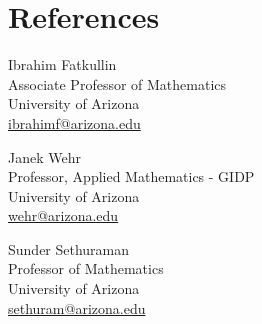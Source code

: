 \documentclass[11pt,letterpaper]{article}
\begin{document}
\section{References}
\begin{minipage}[t]{0.48\textwidth}
  Ibrahim Fatkullin\\
  Associate Professor of Mathematics\\
  University of Arizona\\
  \href{mailto:ibrahimf@arizona.edu}{ibrahimf@arizona.edu}
\end{minipage}\hfill
\begin{minipage}[t]{0.48\textwidth}
  Janek Wehr\\
  Professor, Applied Mathematics - GIDP\\
  University of Arizona\\
  \href{mailto:wehr@arizona.edu}{wehr@arizona.edu}
\end{minipage}

\bigskip
\begin{minipage}[t]{0.48\textwidth}
  Sunder Sethuraman\\
  Professor of Mathematics\\
  University of Arizona\\
  \href{mailto:sethuram@arizona.edu}{sethuram@arizona.edu}
\end{minipage}
\end{document}
